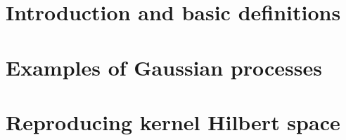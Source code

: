 \section{Introduction and basic definitions}


\section{Examples of Gaussian processes}


\section{Reproducing kernel Hilbert space}